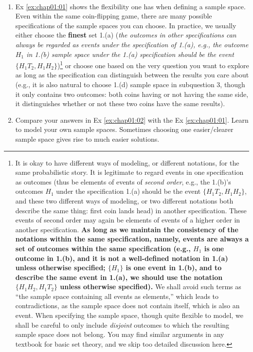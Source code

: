 \begin{remark}~
	\begin{enumerate}
		\item Ex \ref{ex:chap01:01} shows the flexibility one has when defining a sample space. Even within the same coin-flipping game, there are many possible specifications of the sample spaces you can choose. In practice, we usually either choose the \textbf{finest} set 1.(a) (\textit{the outcomes in other specifications can always be regarded as events under the specification of 1.(a), e.g., the outcome $H_1$ in 1.(b) sample space under the 1.(a) specification should be the event $\{H_1T_2, H_1H_2\}$})\footnote{It is okay to have different ways of modeling, or different notations, for the same probabilistic story. It is legitimate to regard events in one specification as outcomes (thus be elements of events of \textit{second order}, e.g., the 1.(b)'s outcomes $H_1$ under the specification 1.(a) should be the event $\{H_1T_2, H_1H_2\}$, and these two different ways of modeling, or two different notations both describe the same thing: first coin lands head)  in another specification. These events of second order may again be elements of events of a higher order in another specification. \textbf{As long as we maintain the consistency of the notations within the same specification, namely, events are always a set of outcomes within the same specification (e.g., $H_1$ is one outcome in 1.(b), and it is not a well-defined notation in 1.(a) unless otherwise specified; $\{H_1\}$ is one event in 1.(b), and to describe the same event in 1.(a), we should use the notation $\{H_1H_2, H_1T_2\}$ unless otherwise specified).} We shall avoid such terms as ``the sample space containing all events as elements,'' which leads to contradictions, as the sample space does not contain itself, which is also an event. When specifying the sample space, though quite flexible to model, we shall be careful to only include \textit{disjoint} outcomes to which the resulting sample space does not belong. You may find similar arguments in any textbook for basic set theory, and we skip too detailed discussion here.} or choose one based on the very question you want to explore as long as the specification can distinguish between the results you care about (e.g., it is also natural to choose 1.(d) sample space in subquestion 3, though it only contains two outcomes: both coins having or not having the same side, it distinguishes whether or not these two coins have the same results).
        \item Compare your answers in Ex \ref{ex:chap01:02} with the Ex \ref{ex:chap01:01}. Learn to model your own sample spaces. Sometimes choosing one easier/clearer sample space gives rise to much easier solutions.
	\end{enumerate}
\end{remark}
	 
